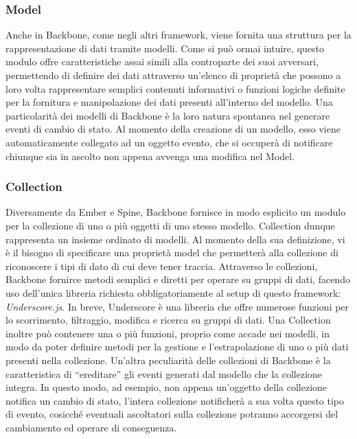 \subsubsection{Model} %
\label{ssub:backbone_model}

Anche in Backbone, come negli altri framework, viene fornita una struttura per la rappresentazione di dati tramite modelli. Come si può ormai intuire, questo modulo offre caratteristiche assai simili alla controparte dei suoi avversari, permettendo di definire dei dati attraverso un'elenco di proprietà che possono a loro volta rappresentare semplici contenuti informativi o funzioni logiche definite per la fornitura e manipolazione dei dati presenti all'interno del modello.
Una particolarità dei modelli di Backbone è la loro natura spontanea nel generare eventi di cambio di stato. Al momento della creazione di un modello, esso viene automaticamente collegato ad un oggetto evento, che si occuperà di notificare chiunque sia in ascolto non appena avvenga una modifica nel Model.

\subsubsection{Collection} %
\label{ssub:backbone_collection}
Diversamente da Ember e Spine, Backbone fornisce in modo esplicito un modulo per la collezione di uno o più oggetti di uno stesso modello.
Collection dunque rappresenta un insieme ordinato di modelli. Al momento della sua definizione, vi è il bisogno di specificare una proprietà model che permetterà alla collezione di riconoscere i tipi di dato di cui deve tener traccia.
Attraverso le collezioni, Backbone fornirce metodi semplici e diretti per operare su gruppi di dati, facendo uso dell'unica libreria richiesta obbligatoriamente al setup di questo framework: {\itshape Underscore.js}. In breve, Underscore è una libreria che offre numerose funzioni per lo scorrimento, filtraggio, modifica e ricerca su gruppi di dati.
Una Collection inoltre può contenere una o più funzioni, proprio come accade nei modelli, in modo da poter definire metodi per la gestione e l'estrapolazione di uno o più dati presenti nella collezione.
Un'altra peculiarità delle collezioni di Backbone è la caratteristica di ``ereditare'' gli eventi generati dal modello che la collezione integra. In questo modo, ad esempio, non appena un'oggetto della collezione notifica un cambio di stato, l'intera collezione notificherà a sua volta questo tipo di evento, cosicché eventuali ascoltatori sulla collezione potranno accorgersi del cambiamento ed operare di conseguenza.

